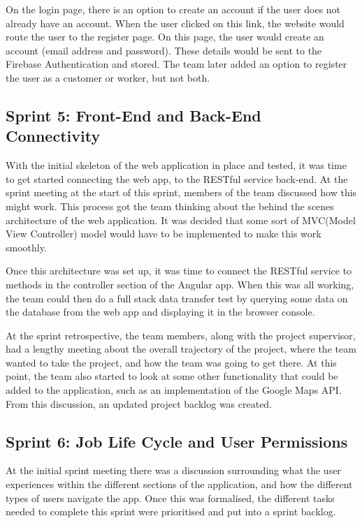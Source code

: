 \bigskip

On the login page, there is an option to create an account if the user does not already have an account. When the user clicked on this link, the website would route the user to the register page. On this page, the user would create an account (email address and password). These details would be sent to the Firebase Authentication and stored. The team later added an option to register the user as a customer or worker, but not both.

\subsection{Sprint 5: Front-End and Back-End Connectivity}
\label{sec:MethodologySprint5}
With the initial skeleton of the web application in place and tested, it was time to get started connecting the web app, to the RESTful service back-end. At the sprint meeting at the start of this sprint, members of the team discussed how this might work. This process got the team thinking about the behind the scenes architecture of the web application. It was decided that some sort of MVC(Model View Controller) model would have to be implemented to make this work smoothly. 

\bigskip

Once this architecture was set up, it was time to connect the RESTful service to methods in the controller section of the Angular app. When this was all working, the team could then do a full stack data transfer test by querying some data on the database from the web app and displaying it in the browser console.

\bigskip

At the sprint retrospective, the team members, along with the project supervisor, had a lengthy meeting about the overall trajectory of the project, where the team wanted to take the project, and how the team was going to get there. At this point, the team also started to look at some other functionality that could be added to the application, such as an implementation of the Google Maps API. From this discussion, an updated project backlog was created.


\subsection{Sprint 6: Job Life Cycle and User Permissions}
\label{sec:MethodologySprint6}
At the initial sprint meeting there was a discussion surrounding what the user experiences within the different sections of the application, and how the different types of users navigate the app. Once this was formalised, the different tasks needed to complete this sprint were prioritised and put into a sprint backlog. 

